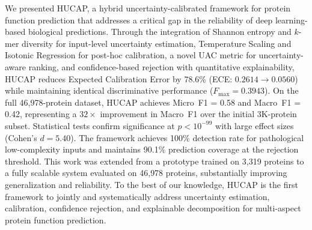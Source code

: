 \documentclass[conference]{IEEEtran}
\begin{document}
We presented HUCAP, a hybrid uncertainty-calibrated framework for protein function prediction that addresses a critical gap in the reliability of deep learning-based biological predictions. Through the integration of Shannon entropy and $k$-mer diversity for input-level uncertainty estimation, Temperature Scaling and Isotonic Regression for post-hoc calibration, a novel UAC metric for uncertainty-aware ranking, and confidence-based rejection with quantitative explainability, HUCAP reduces Expected Calibration Error by 78.6\% (ECE: $0.2614 \to 0.0560$) while maintaining identical discriminative performance ($F_{\max} = 0.3943$). On the full 46{,}978-protein dataset, HUCAP achieves Micro~F1 = 0.58 and Macro~F1 = 0.42, representing a $32\times$ improvement in Macro~F1 over the initial 3K-protein subset. Statistical tests confirm significance at $p < 10^{-99}$ with large effect sizes (Cohen's $d = 5.40$). The framework achieves 100\% detection rate for pathological low-complexity inputs and maintains 90.1\% prediction coverage at the rejection threshold. This work was extended from a prototype trained on 3{,}319 proteins to a fully scalable system evaluated on 46{,}978 proteins, substantially improving generalization and reliability. To the best of our knowledge, HUCAP is the first framework to jointly and systematically address uncertainty estimation, calibration, confidence rejection, and explainable decomposition for multi-aspect protein function prediction.
\end{document}
